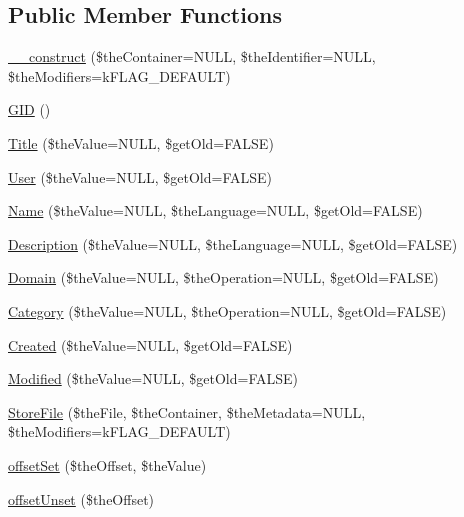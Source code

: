 \subsection*{Public Member Functions}
\begin{DoxyCompactItemize}
\item 
\hyperlink{class_c_dataset_ac85b53d5a48ce3c6c36ffbafd9eabcf4}{\-\_\-\-\_\-construct} (\$the\-Container=N\-U\-L\-L, \$the\-Identifier=N\-U\-L\-L, \$the\-Modifiers=k\-F\-L\-A\-G\-\_\-\-D\-E\-F\-A\-U\-L\-T)
\item 
\hyperlink{class_c_dataset_af44d770e9ee1f72530b8fc19c759a586}{G\-I\-D} ()
\item 
\hyperlink{class_c_dataset_a560c5a4e4d453bd3f1e5a8fa49fb0012}{Title} (\$the\-Value=N\-U\-L\-L, \$get\-Old=F\-A\-L\-S\-E)
\item 
\hyperlink{class_c_dataset_ab462365e96da63373576ea2e19819c8c}{User} (\$the\-Value=N\-U\-L\-L, \$get\-Old=F\-A\-L\-S\-E)
\item 
\hyperlink{class_c_dataset_a2ebcf2c81be37a425f09895d25e69458}{Name} (\$the\-Value=N\-U\-L\-L, \$the\-Language=N\-U\-L\-L, \$get\-Old=F\-A\-L\-S\-E)
\item 
\hyperlink{class_c_dataset_a16f38f4d6744d63f846d604f81d41ef3}{Description} (\$the\-Value=N\-U\-L\-L, \$the\-Language=N\-U\-L\-L, \$get\-Old=F\-A\-L\-S\-E)
\item 
\hyperlink{class_c_dataset_a3e6a6185756febe859118223b32a91e2}{Domain} (\$the\-Value=N\-U\-L\-L, \$the\-Operation=N\-U\-L\-L, \$get\-Old=F\-A\-L\-S\-E)
\item 
\hyperlink{class_c_dataset_afac7cb6635f9295bcfccbac0bd4ee314}{Category} (\$the\-Value=N\-U\-L\-L, \$the\-Operation=N\-U\-L\-L, \$get\-Old=F\-A\-L\-S\-E)
\item 
\hyperlink{class_c_dataset_a189492fea657a8bf5a4186bd516fa57e}{Created} (\$the\-Value=N\-U\-L\-L, \$get\-Old=F\-A\-L\-S\-E)
\item 
\hyperlink{class_c_dataset_a81e723c164a7141a0a9b45709ed297d1}{Modified} (\$the\-Value=N\-U\-L\-L, \$get\-Old=F\-A\-L\-S\-E)
\item 
\hyperlink{class_c_dataset_ab82a571ed30ea5b9d5f84bafad05eecd}{Store\-File} (\$the\-File, \$the\-Container, \$the\-Metadata=N\-U\-L\-L, \$the\-Modifiers=k\-F\-L\-A\-G\-\_\-\-D\-E\-F\-A\-U\-L\-T)
\item 
\hyperlink{class_c_dataset_a72f36837282a754ba453799172802e31}{offset\-Set} (\$the\-Offset, \$the\-Value)
\item 
\hyperlink{class_c_dataset_a9f048a8cbe7109da16a8ef2b7cbd2165}{offset\-Unset} (\$the\-Offset)
\end{DoxyCompactItemize}
